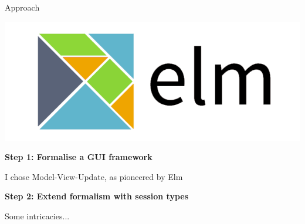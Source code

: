 \documentclass[11.5pt, aspectratio=169]{beamer}
\begin{document}
\begin{frame}{Approach}

  \begin{minipage}{0.25\textwidth}
      \includegraphics[width=\textwidth]{images/ElmLogo.png}
  \end{minipage}
  \hfill
  \begin{minipage}{0.7\textwidth}
    {\large \textbf{Step 1: Formalise a GUI framework}}
    \begin{itemize}
      \itemR I chose Model-View-Update, as pioneered by Elm
    \end{itemize}
  \end{minipage}

  \vspace{2em}

  \begin{minipage}{0.25\textwidth}
    \begin{center}
      \scalebox{2.5}{\Huge $\pi$}
    \end{center}
  \end{minipage}
  \hfill
  \begin{minipage}{0.7\textwidth}
    {\large \textbf{Step 2: Extend formalism with session types}}
   \begin{itemize}
   \itemR Some intricacies...
   \end{itemize}
  \end{minipage}

  \vspace{2em}


\end{frame}
\end{document}
